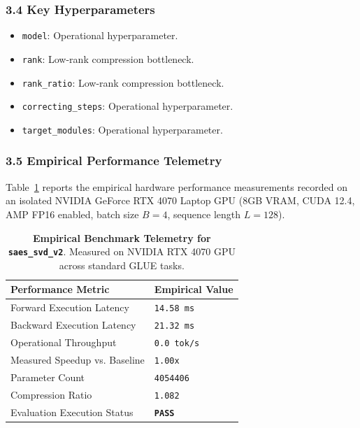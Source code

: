 \subsubsection*{3.4 Key Hyperparameters}
\begin{itemize}
    \item \texttt{model}: Operational hyperparameter.
    \item \texttt{rank}: Low-rank compression bottleneck.
    \item \texttt{rank\_ratio}: Low-rank compression bottleneck.
    \item \texttt{correcting\_steps}: Operational hyperparameter.
    \item \texttt{target\_modules}: Operational hyperparameter.
\end{itemize}

\subsubsection*{3.5 Empirical Performance Telemetry}
Table~\ref{tab:telemetry_saes\_svd\_v2} reports the empirical hardware performance measurements recorded on an isolated NVIDIA GeForce RTX 4070 Laptop GPU (8GB VRAM, CUDA 12.4, AMP FP16 enabled, batch size $B=4$, sequence length $L=128$).

\begin{table}[h]
\centering
\small
\caption{\textbf{Empirical Benchmark Telemetry for \texttt{saes\_svd\_v2}}. Measured on NVIDIA RTX 4070 GPU across standard GLUE tasks.}
\label{tab:telemetry_saes\_svd\_v2}
\begin{tabularx}{\columnwidth}{lX}
\toprule
\textbf{Performance Metric} & \textbf{Empirical Value} \\
\midrule
Forward Execution Latency & \texttt{14.58 ms} \\
Backward Execution Latency & \texttt{21.32 ms} \\
Operational Throughput & \texttt{0.0 tok/s} \\
Measured Speedup vs. Baseline & \texttt{1.00x} \\
Parameter Count & \texttt{4054406} \\
Compression Ratio & \texttt{1.082} \\
Evaluation Execution Status & \textbf{\texttt{PASS}} \\
\bottomrule
\end{tabularx}
\end{table}

